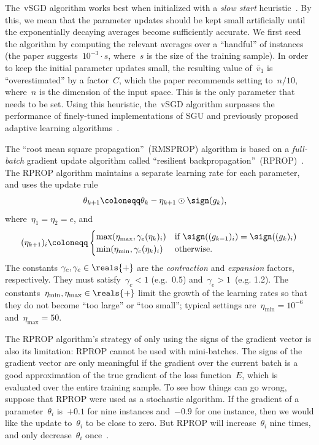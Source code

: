 \documentclass[11pt,a4paper]{article}
\numberwithin{equation}{section}
\begin{document}
The~vSGD algorithm works best when initialized with a \emph{slow start}
heuristic~\citep{schaul-icml-13}. By this, we mean that the parameter updates
should be kept small artificially until the exponentially decaying averages
become sufficiently accurate. We first seed the algorithm by computing the
relevant averages over a ``handful'' of instances (the paper suggests~$10^{-3}
\cdot s$, where~$s$ is the size of the training sample). In order to keep the
initial parameter updates small, the resulting value of~$\bar{v}_1$ is
``overestimated'' by a factor~$C$, which the paper recommends setting to~$n /
10$, where~$n$ is the dimension of the input space. This is the only parameter
that needs to be set. Using this heuristic, the~vSGD algorithm surpasses the
performance of finely-tuned implementations of SGU and previously proposed
adaptive learning algorithms~\citep{schaul-icml-13}.

The ``root mean square propagation''~(RMSPROP) algorithm is based on a
\emph{full-batch} gradient update algorithm called ``resilient
backpropagation''~(RPROP)~\citep{hinton-nnml-2014}. The RPROP algorithm
maintains a separate learning rate for each parameter, and uses the update rule
\begin{align*}
	\theta_{k + 1} &\coloneqq \theta_k - \eta_{k + 1} \odot \sign(g_k),
\end{align*}
where~$\eta_1 = \eta_2 = e$, and
\[
	(\eta_{k + 1})_i \coloneqq
	\begin{cases} 
	\max(\eta_{\text{max}}, \gamma_e (\eta_k)_i) &
		\text{if $\sign((g_{k - 1})_i) = \sign((g_k)_i)$} \\
	\min(\eta_{\text{min}}, \gamma_c (\eta_k)_i) &
		\text{otherwise.}
	\end{cases}
\]
The constants $\gamma_c, \gamma_e \in \reals{+}$ are the \emph{contraction} and
\emph{expansion} factors, respectively. They must satisfy~$\gamma_c < 1$
(e.g.~$0.5$) and~$\gamma_e > 1$~(e.g. 1.2). The constants~$\eta_{\text{min}},
\eta_{\text{max}} \in \reals{+}$ limit the growth of the learning rates so that
they do not become ``too large'' or ``too small''; typical settings
are~$\eta_{\text{min}} = 10^{-6}$ and~$\eta_{\text{max}} = 50$.

The RPROP algorithm's strategy of only using the signs of the gradient vector is
also its limitation: RPROP cannot be used with mini-batches. The signs of the
gradient vector are only meaningful if the gradient over the current batch is a
good approximation of the true gradient of the loss function~$E$, which is
evaluated over the entire training sample. To see how things can go wrong,
suppose that RPROP were used as a stochastic algorithm. If the gradient of a
parameter~$\theta_i$ is~$+0.1$ for nine instances and~$-0.9$ for one instance,
then we would like the update to~$\theta_i$ to be close to zero. But RPROP will
increase~$\theta_i$ nine times, and only decrease~$\theta_i$
once~\citep{hinton-nnml-2014}.
\end{document}
